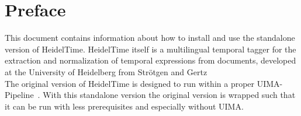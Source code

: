 \section{Preface}\label{sec:Preface}
This document contains information about how to install and use the standalone version of HeidelTime. HeidelTime itself is a multilingual temporal tagger for the extraction and normalization of temporal expressions from documents, developed at the University of Heidelberg from Str\"otgen and Gertz~\cite{Strotgen2010, HeidelTime, StroetgenGertz2013}\\
The original version of HeidelTime is designed to run within a proper UIMA-Pipeline~\cite{UIMA}. With this standalone version the original version is wrapped such that it can be run with less prerequisites and especially without UIMA.
